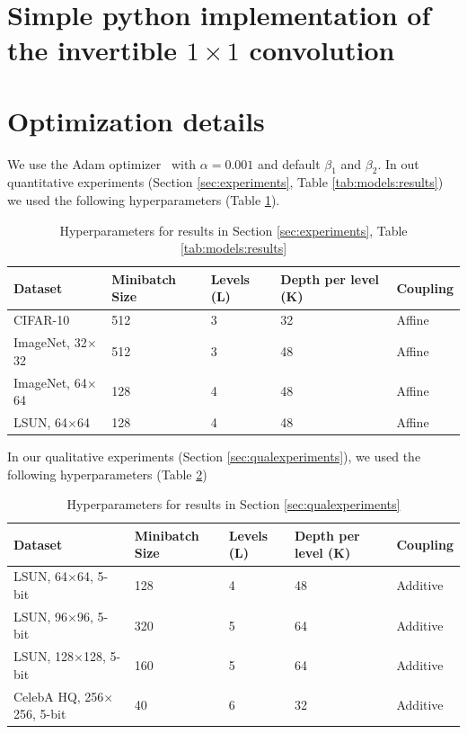 \documentclass{article}
\begin{document}
\section{Simple python implementation of the invertible $1 \times 1$ convolution}

\section{Optimization details}\label{sec:opt}

We use the Adam optimizer~\citep{kingma2015adam} with $\alpha=0.001$ and default $\beta_1$ and $\beta_2$. In out quantitative experiments (Section \ref{sec:experiments}, Table \ref{tab:models:results}) we used the following hyperparameters (Table \ref{tab:models:hyper}). \\
\begin{table}[h]
    \centering
    \caption{Hyperparameters for results in Section \ref{sec:experiments}, Table \ref{tab:models:results}}
    \label{tab:models:hyper}
    \begin{tabular}{l | l | l | l | l}
    \toprule
    Dataset & Minibatch Size & Levels (L) & Depth per level (K) & Coupling
    \\\midrule
    CIFAR-10 & 512 & 3 & 32 & Affine
    \\\midrule
    ImageNet, 32$\times$32 & 512 & 3 & 48 & Affine
    \\\midrule
    ImageNet, 64$\times$64 & 128 & 4 & 48 & Affine
    \\\midrule
    LSUN, 64$\times$64 & 128 & 4 & 48 & Affine
    \\\bottomrule
    \end{tabular}
\end{table}

In our qualitative experiments (Section \ref{sec:qualexperiments}), we used the following hyperparameters (Table \ref{tab:models:hyper_qual})
\begin{table}[h]
    \centering
    \caption{Hyperparameters for results in Section \ref{sec:qualexperiments}}
    \label{tab:models:hyper_qual}
    \begin{tabular}{l | l | l | l | l}
    \toprule
    Dataset & Minibatch Size & Levels (L) & Depth per level (K) & Coupling
    \\\midrule
    LSUN, 64$\times$64, 5-bit & 128 & 4 & 48 & Additive
    \\\midrule
    LSUN, 96$\times$96, 5-bit & 320 & 5 & 64 & Additive
    \\\midrule
    LSUN, 128$\times$128, 5-bit & 160 & 5 & 64 & Additive
    \\\midrule
    CelebA HQ, 256$\times$256, 5-bit & 40 & 6 & 32 & Additive
    \\\bottomrule
    \end{tabular}
\end{table}
\end{document}
